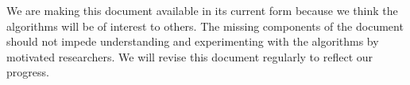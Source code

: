 \documentclass{report}
\begin{document}
We are making this document available in its current form because we
think the algorithms will be of interest to others. The missing
components of the document should not impede understanding and
experimenting with the algorithms by motivated researchers. We will
revise this document regularly to reflect our progress.

\tableofcontents








\appendix




\end{document}
